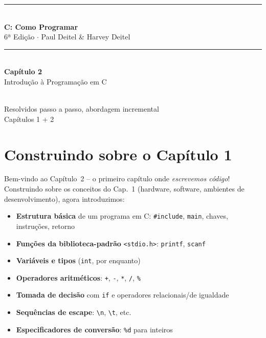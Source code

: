 \documentclass[12pt,a4paper]{article}
\begin{document}
\begin{titlepage}
  \centering\vspace*{2cm}
  {\color{deitelblue}\rule{\linewidth}{2pt}}\\[0.4cm]
  {\huge\bfseries\color{deitelblue}C: Como Programar}\\[0.2cm]
  {\large\color{deitelblue}6ª Edição $\cdot$ Paul Deitel \& Harvey Deitel}\\[0.2cm]
  {\color{deitelblue}\rule{\linewidth}{2pt}}\\[1cm]
  {\LARGE\bfseries Capítulo 2}\\[0.3cm]
  {\Large\color{deitelblue!80}Introdução à Programação em C}\\[0.8cm]
  \begin{tcolorbox}[colback=deitellightblue,colframe=deitelblue,width=0.85\linewidth]
    \\[0.2cm]
    {\normalsize Resolvidos passo a passo, abordagem incremental\\
    Capítulos 1 + 2}
  \end{tcolorbox}
\end{titlepage}

\section*{Construindo sobre o Capítulo 1}

Bem-vindo ao Capítulo~2 -- o primeiro capítulo onde \textit{escrevemos código}!
Construindo sobre os conceitos do Cap.~1 (hardware, software, ambientes de
desenvolvimento), agora introduzimos:

\begin{itemize}[noitemsep]
  \item \textbf{Estrutura básica} de um programa em C: \texttt{\#include},
  \texttt{main}, chaves, instruções, retorno
  \item \textbf{Funções da biblioteca-padrão} \texttt{<stdio.h>}: \texttt{printf}, \texttt{scanf}
  \item \textbf{Variáveis e tipos} (\texttt{int}, por enquanto)
  \item \textbf{Operadores aritméticos}: \texttt{+}, \texttt{-}, \texttt{*}, \texttt{/}, \texttt{\%}
  \item \textbf{Tomada de decisão} com \texttt{if} e operadores relacionais/de igualdade
  \item \textbf{Sequências de escape}: \texttt{\textbackslash n}, \texttt{\textbackslash t}, etc.
  \item \textbf{Especificadores de conversão}: \texttt{\%d} para inteiros
\end{itemize}
\end{document}
